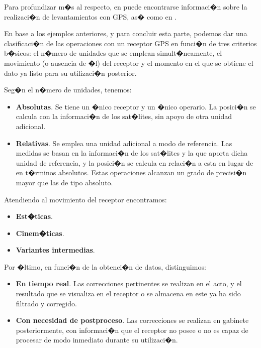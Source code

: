 Para profundizar m�s al respecto, en \cite{Asenjo1997UPV} puede encontrarse informaci�n sobre la realizaci�n de levantamientos con GPS, as� como en \cite{GPSUSArmy}.

En base a los ejemplos anteriores, y para concluir esta parte, podemos dar una clasificaci�n de las operaciones con un receptor GPS en funci�n de tres criterios b�sicos: el n�mero de unidades que se emplean simult�neamente, el movimiento (o ausencia de �l) del receptor y el momento en el que se obtiene el dato ya listo para su utilizaci�n posterior.

Seg�n el n�mero de unidades, tenemos:

\begin{itemize}
	\item \textbf{Absolutas}. Se tiene un �nico receptor y un �nico operario. La posici�n se calcula con la informaci�n de los sat�lites, sin apoyo de otra unidad adicional.
	\item \textbf{Relativas}. Se emplea una unidad adicional a modo de referencia. Las medidas se basan en la informaci�n de los sat�lites y la que aporta dicha unidad de referencia, y la posici�n se calcula en relaci�n a esta en lugar de en t�rminos absolutos. Estas operaciones alcanzan un grado de precisi�n mayor que las de tipo absoluto.
\end{itemize}

Atendiendo al movimiento del receptor encontramos:

\begin{itemize}
	\item \textbf{Est�ticas}.
	\item \textbf{Cinem�ticas}.
	\item \textbf{Variantes intermedias}.
\end{itemize}

Por �ltimo, en funci�n de la obtenci�n de datos, distinguimos:

\begin{itemize}
	\item \textbf{En tiempo real}. Las correcciones pertinentes se realizan en el acto, y el resultado que se visualiza en el receptor o se almacena en este ya ha sido filtrado y corregido.
	\item \textbf{Con necesidad de postproceso}. Las correcciones se realizan en gabinete posteriormente, con informaci�n que el receptor no posee o no es capaz de procesar de modo inmediato durante su utilizaci�n.
\end{itemize}

